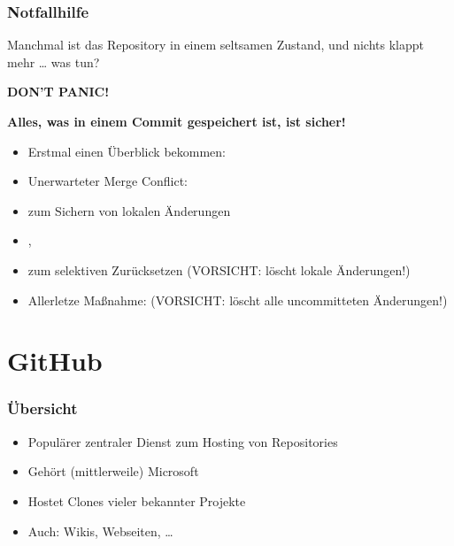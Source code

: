 \documentclass{cms-kurs}
\begin{document}
\begin{frame}
  \frametitle{Notfallhilfe}

  \onslide<+->

  Manchmal ist das Repository in einem seltsamen Zustand, und nichts klappt mehr
  … was tun?

  \onslide<+->

  \begin{center}
    \Large\textcolor{red!80!black}{\textbf{DON'T PANIC!}}
  \end{center}

  \smallskip{}

  \textbf{Alles, was in einem Commit gespeichert ist, ist sicher!}

  \medskip{}

  \begin{itemize}[<+->]
  \item Erstmal einen Überblick bekommen: 
  \item Unerwarteter Merge Conflict: 
  \item {} zum Sichern von lokalen Änderungen
  \item {}, 
  \item {} zum selektiven Zurücksetzen (VORSICHT:
    löscht lokale Änderungen!)
  \item Allerletze Maßnahme:  (VORSICHT: löscht alle
    uncommitteten Änderungen!)
  \end{itemize}

\end{frame}


\section{GitHub}

\begin{frame}
  \frametitle{Übersicht}

  \onslide<+->

  \begin{itemize}
  \item Populärer zentraler Dienst zum Hosting von Repositories
  \item Gehört (mittlerweile) Microsoft
  \item Hostet Clones vieler bekannter Projekte
  \item Auch: Wikis, Webseiten, …
  \end{itemize}

\end{frame}
\end{document}
